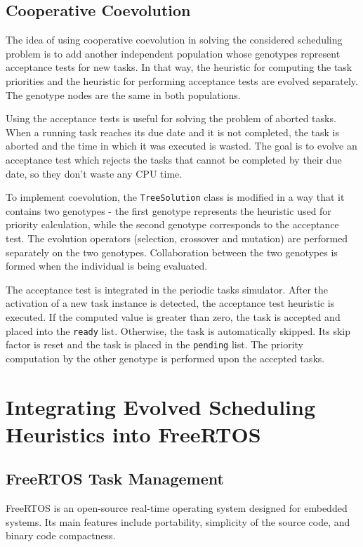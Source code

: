 \subsection{Cooperative Coevolution}
The idea of using cooperative coevolution in solving the considered scheduling problem is to add another independent population whose genotypes represent acceptance tests for new tasks.
In that way, the heuristic for computing the task priorities and the heuristic for performing acceptance tests are evolved separately.
The genotype nodes are the same in both populations.

Using the acceptance tests is useful for solving the problem of aborted tasks.
When a running task reaches its due date and it is not completed, the task is aborted and the time 
in which it was executed is wasted.
The goal is to evolve an acceptance test which rejects the tasks that cannot be completed by their due date, so they don't waste any CPU time.

To implement coevolution, the \texttt{TreeSolution} class is modified in a way that it contains two genotypes - the first genotype represents the heuristic used for priority calculation, while the second genotype corresponds to the acceptance test. 
The evolution operators (selection, crossover and mutation) are performed separately on the two genotypes.
Collaboration between the two genotypes is formed when the individual is being evaluated.

The acceptance test is integrated in the periodic tasks simulator.
After the activation of a new task instance is detected, the acceptance test heuristic is executed.
If the computed value is greater than zero, the task is accepted and placed into the \texttt{ready} list.
Otherwise, the task is automatically skipped. 
Its skip factor is reset and the task is placed in the \texttt{pending} list.
The priority computation by the other genotype is performed upon the accepted tasks.

\section{Integrating Evolved Scheduling Heuristics into FreeRTOS}
\subsection{FreeRTOS Task Management}
FreeRTOS is an open-source real-time operating system designed for embedded systems. 
Its main features include portability, simplicity of the source code, and binary code compactness. 


